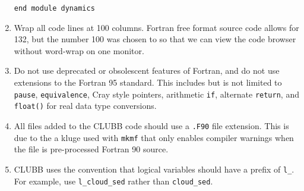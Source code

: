 \documentclass[letterpaper,12pt]{article}
\begin{document}
\begin{enumerate}
\verb|end module dynamics|

\item Wrap all code lines at 100 columns.  Fortran free format source code
allows for 132, but the number 100 was chosen to so that we can view the code 
browser without word-wrap on one monitor.

\item Do not use deprecated or obsolescent features of Fortran, and do not
use extensions to the Fortran 95 standard.  This includes but is not limited to
\texttt{pause}, \texttt{equivalence}, Cray style pointers, 
arithmetic \texttt{if}, alternate \texttt{return}, and \texttt{float()} for 
real data type conversions.

\item All files added to the CLUBB code should use a \texttt{.F90} file 
extension.  This is due to the a kluge used with \texttt{mkmf} that only enables
compiler warnings when the file is pre-processed Fortran 90 source. 

\item CLUBB uses the convention that logical variables should have a prefix of \verb|l_|.  For example,
use \verb|l_cloud_sed| rather than \verb|cloud_sed|.

\end{enumerate}
\end{document}

